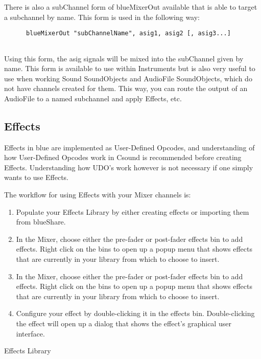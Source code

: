There is also a subChannel form of blueMixerOut available that is able
to target a subchannel by name. This form is used in the following way:

\begin{verbatim}
      blueMixerOut "subChannelName", asig1, asig2 [, asig3...]
    
\end{verbatim}

Using this form, the asig signals will be mixed into the subChannel
given by name. This form is available to use within Instruments but is
also very useful to use when working Sound SoundObjects and AudioFile
SoundObjects, which do not have channels created for them. This way, you
can route the output of an AudioFile to a named subchannel and apply
Effects, etc.

\subsection{Effects}

Effects in blue are implemented as User-Defined Opcodes, and
understanding of how User-Defined Opcodes work in Csound is recommended
before creating Effects. Understanding how UDO's work however is not
necessary if one simply wants to use Effects.

The workflow for using Effects with your Mixer channels is:

\begin{enumerate}
\def\labelenumi{\arabic{enumi}.}
\item
  Populate your Effects Library by either creating effects or importing
  them from blueShare.
\item
  In the Mixer, choose either the pre-fader or post-fader effects bin to
  add effects. Right click on the bins to open up a popup menu that
  shows effects that are currently in your library from which to choose
  to insert.
\item
  In the Mixer, choose either the pre-fader or post-fader effects bin to
  add effects. Right click on the bins to open up a popup menu that
  shows effects that are currently in your library from which to choose
  to insert.
\item
  Configure your effect by double-clicking it in the effects bin.
  Double-clicking the effect will open up a dialog that shows the
  effect's graphical user interface.
\end{enumerate}

Effects Library

